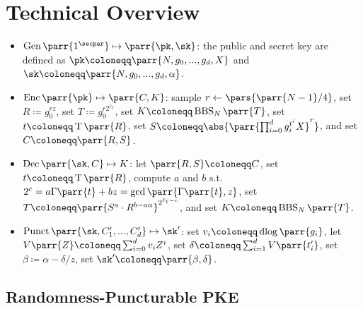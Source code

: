 \section{Technical Overview}
\label{sec:overview}

\begin{itemize}
    \item \(\Gen\parr{1^\secpar} \mapsto \parr{\pk,\sk}\):
    the public and secret key are defined as \(\pk \coloneqq \parr{N, g_0, ..., g_d, X}\) and \(\sk \coloneqq \parr{N, g_0, ..., g_d, \alpha}\).
    
    \item \(\Enc\parr{\pk} \mapsto \parr{C,K}\):
    sample \(r \gets \pars{\parr{N-1}/4}\),
    set \(R \coloneqq g_0^{r z}\),
    set \(T \coloneqq g_0^{r 2^{\ell_{\mathsf{T}}}}\),
    set \(K \coloneqq \operatorname{BBS}_N\parr{T}\),
    set \(t \coloneqq \operatorname{T}\parr{R}\),
    set \(S \coloneqq \abs{\parr{\prod_{i=0}^d g_i^{t^i} X}^r}\),
    and set \(C \coloneqq \parr{R,S}\).

    \item \(\Dec\parr{\sk,C} \mapsto K\):
    let \(\parr{R,S} \coloneqq C\),
    set \(t \coloneqq \operatorname{T}\parr{R}\),
    compute \(a\) and \(b\) s.t.\ \(2^c = a \Gamma\parr{t} + b z = \gcd\parr{\Gamma\parr{t}, z}\),
    set \(T \coloneqq \parr{S^a \cdot R^{b - a \alpha}}^{2^{\ell_{\mathsf{T}}-c}}\),
    and set \(K \coloneqq \operatorname{BBS}_N\parr{T}\).

    \item \(\Punct\parr{\sk,C'_1,...,C'_d} \mapsto \sk'\):
    set \(v_i \coloneqq \operatorname{dlog}\parr{g_i}\),
    let \(V\parr{Z} \coloneqq \sum_{i=0}^d v_i Z^i\),
    set \(\delta \coloneqq \sum_{i=1}^d V\parr{t'_i}\),
    set \(\beta \coloneqq \alpha - \delta/z\),
    set \(\sk' \coloneqq \parr{\beta, \delta}\).
\end{itemize}


\subsection{Randomness-Puncturable PKE}

